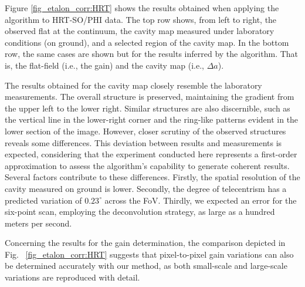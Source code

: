 Figure \ref{fig_etalon_corr:HRT} shows the results obtained when applying the algorithm to HRT-SO/PHI data. The top row shows, from left to right, the observed flat at the continuum, the cavity map measured under laboratory conditions (on ground), and a selected region of the cavity map. In the bottom row, the same cases are shown but for the results inferred by the algorithm. That is, the flat-field (i.e., the gain) and the cavity map (i.e., $\Delta a$).

The results obtained for the cavity map closely resemble the laboratory measurements. The overall structure is preserved, maintaining the gradient from the upper left to the lower right. Similar structures are also discernible, such as the vertical line in the lower-right corner and the ring-like patterns evident in the lower section of the image. However, closer scrutiny of the observed structures reveals some differences. This deviation between results and measurements is expected, considering that the experiment conducted here represents a first-order approximation to assess the algorithm's capability to generate coherent results. Several factors contribute to these differences. Firstly, the spatial resolution of the cavity measured on ground is lower. Secondly, the degree of telecentrism has a predicted variation of $0.23^\circ$ across the FoV. Thirdly, we expected an error for the six-point scan, employing the deconvolution strategy, as large as a hundred meters per second.

Concerning the results for the gain determination, the comparison depicted in Fig.~ \ref{fig_etalon_corr:HRT} suggests that pixel-to-pixel gain variations can also be determined accurately with our method, as both small-scale and large-scale variations are reproduced with detail. 

